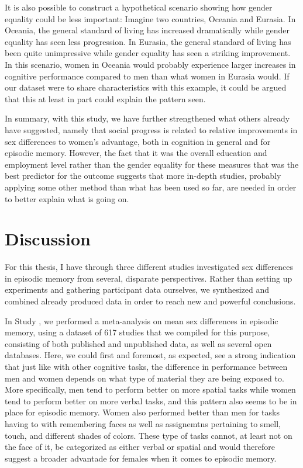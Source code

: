 It is also possible to construct a hypothetical scenario showing how gender equality could be less important: Imagine two countries, Oceania and Eurasia. In Oceania, the general standard of living has increased dramatically while gender equality has seen less progression. In Eurasia, the general standard of living has been quite unimpressive while gender equality has seen a striking improvement. In this scenario, women in Oceania would probably experience larger increases in cognitive performance compared to men than what women in Eurasia would. If our dataset were to share characteristics with this example, it could be argued that this at least in part could explain the pattern seen.

In summary, with this study, we have further strengthened what others already have suggested, namely that social progress is related to relative improvements in sex differences to women's advantage, both in cognition in general and for episodic memory. However, the fact that it was the overall education and employment level rather than the gender equality for these measures that was the best predictor for the outcome suggests that more in-depth studies, probably applying some other method than what has been used so far, are needed in order to better explain what is going on.

\section{Discussion}

For this thesis, I have through three different studies investigated sex differences in episodic memory from several, disparate perspectives. Rather than setting up experiments and gathering participant data ourselves, we synthesized and combined already produced data in order to reach new and powerful conclusions.

In Study , we performed a meta-analysis on mean sex differences in episodic memory, using a dataset of 617 studies that we compiled for this purpose, consisting of both published and unpublished data, as well as several open databases. Here, we could first and foremost, as expected, see a strong indication that just like with other cognitive tasks, the difference in performance between men and women depends on what type of material they are being exposed to. More specifically, men tend to perform better on more spatial tasks while women tend to perform better on more verbal tasks, and this pattern also seems to be in place for episodic memory. Women also performed better than men for tasks having to with remembering faces as well as assignemtns pertaining to smell, touch, and different shades of colors. These type of tasks cannot, at least not on the face of it, be categorized as either verbal or spatial and would therefore suggest a broader advantade for females when it comes to episodic memory.

